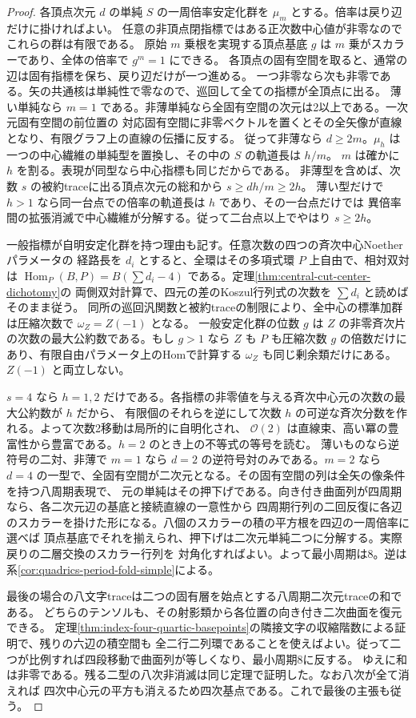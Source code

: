 \begin{proof}
各頂点次元 $d$ の単純 $S$ の一周倍率安定化群を $\mu_m$ とする。倍率は戻り辺だけに掛ければよい。
任意の非頂点閉指標ではある正次数中心値が非零なのでこれらの群は有限である。
原始 $m$ 乗根を実現する頂点基底 $g$ は $m$ 乗がスカラーであり、全体の倍率で $g^m=1$ にできる。
各頂点の固有空間を取ると、通常の辺は固有指標を保ち、戻り辺だけが一つ進める。
一つ非零なら次も非零である。矢の共通核は単純性で零なので、巡回して全ての指標が全頂点に出る。
薄い単純なら $m=1$ である。非薄単純なら全固有空間の次元は2以上である。一次元固有空間の前位置の
対応固有空間に非零ベクトルを置くとその全矢像が直線となり、有限グラフ上の直線の伝播に反する。
従って非薄なら $d\ge2m$。$\mu_h$ は一つの中心繊維の単純型を置換し、その中の $S$ の軌道長は $h/m$。
$m$ は確かに $h$ を割る。表現が同型なら中心指標も同じだからである。
非薄型を含めば、次数 $s$ の被約traceに出る頂点次元の総和から $s\ge d h/m\ge2h$。
薄い型だけで $h>1$ なら同一台点での倍率の軌道長は $h$ であり、その一台点だけでは
異倍率間の拡張消滅で中心繊維が分解する。従って二台点以上でやはり $s\ge2h$。

一般指標が自明安定化群を持つ理由も記す。任意次数の四つの斉次中心Noetherパラメータの
経路長を $d_i$ とすると、全環はその多項式環 $P$ 上自由で、相対双対は
$\operatorname{Hom}_P(B,P)=B(\sum d_i-4)$ である。定理\ref{thm:central-cut-center-dichotomy}の
両側双対計算で、四元の差のKoszul行列式の次数を $\sum d_i$ と読めばそのまま従う。
同所の巡回汎関数と被約traceの制限により、全中心の標準加群は圧縮次数で $\omega_Z=Z(-1)$ となる。
一般安定化群の位数 $g$ は $Z$ の非零斉次片の次数の最大公約数である。もし $g>1$ なら $Z$ も
$P$ も圧縮次数 $g$ の倍数だけにあり、有限自由パラメータ上のHomで計算する $\omega_Z$ も同じ剰余類だけにある。
$Z(-1)$ と両立しない。

$s=4$ なら $h=1,2$ だけである。各指標の非零値を与える斉次中心元の次数の最大公約数が $h$ だから、
有限個のそれらを逆にして次数 $h$ の可逆な斉次分数を作れる。よって次数2移動は局所的に自明化され、
$\mathcal O(2)$ は直線束、高い冪の豊富性から豊富である。$h=2$ のとき上の不等式の等号を読む。
薄いものなら逆符号の二対、非薄で $m=1$ なら $d=2$ の逆符号対のみである。$m=2$ なら
$d=4$ の一型で、全固有空間が二次元となる。その固有空間の列は全矢の像条件を持つ八周期表現で、
元の単純はその押下げである。向き付き曲面列が四周期なら、各二次元辺の基底と接続直線の一意性から
四周期行列の二回反復に各辺のスカラーを掛けた形になる。八個のスカラーの積の平方根を四辺の一周倍率に選べば
頂点基底でそれを揃えられ、押下げは二次元単純二つに分解する。実際戻りの二層交換のスカラー行列を
対角化すればよい。よって最小周期は8。逆は系\ref{cor:quadrics-period-fold-simple}による。

最後の場合の八文字traceは二つの固有層を始点とする八周期二次元traceの和である。
どちらのテンソルも、その射影類から各位置の向き付き二次曲面を復元できる。
定理\ref{thm:index-four-quartic-basepoints}の隣接文字の収縮階数による証明で、残りの六辺の積空間も
全二行二列環であることを使えばよい。従って二つが比例すれば四段移動で曲面列が等しくなり、最小周期8に反する。
ゆえに和は非零である。残る二型の八次非消滅は同じ定理で証明した。なお八次が全て消えれば
四次中心元の平方も消えるため四次基点である。これで最後の主張も従う。
\end{proof}

